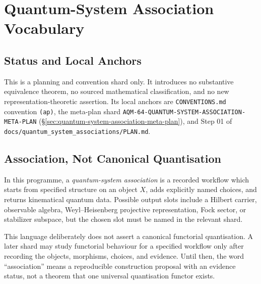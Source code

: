 
\section{Quantum-System Association Vocabulary}
\label{sec:quantum-system-association-vocabulary}

\subsection{Status and Local Anchors}

This is a planning and convention shard only.  It introduces no substantive
equivalence theorem, no sourced mathematical classification, and no new
representation-theoretic assertion.  Its local anchors are
\texttt{CONVENTIONS.md} convention \texttt{(ap)}, the meta-plan shard
\texttt{AQM-64-QUANTUM-SYSTEM-ASSOCIATION-META-PLAN}
(\S\ref{sec:quantum-system-association-meta-plan}), and Step 01 of
\texttt{docs/quantum\_system\_associations/PLAN.md}.

\subsection{Association, Not Canonical Quantisation}

In this programme, a \emph{quantum-system association} is a recorded workflow
which starts from specified structure on an object \(X\), adds explicitly
named choices, and returns kinematical quantum data.  Possible output slots
include a Hilbert carrier, observable algebra, Weyl--Heisenberg projective
representation, Fock sector, or stabilizer subspace, but the chosen slot must
be named in the relevant shard.

This language deliberately does not assert a canonical functorial
quantisation.  A later shard may study functorial behaviour for a specified
workflow only after recording the objects, morphisms, choices, and evidence.
Until then, the word ``association'' means a reproducible construction
proposal with an evidence status, not a theorem that one universal
quantisation functor exists.

